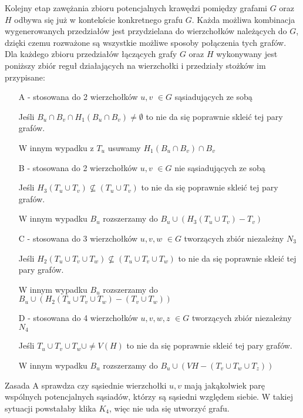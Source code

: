 Kolejny etap zawężania zbioru potencjalnych krawędzi pomiędzy grafami $G$ oraz $H$ odbywa się już w kontekście konkretnego grafu $G$. Każda możliwa kombinacja wygenerowanych przedziałów jest  przydzielana do wierzchołków należących do $G$, dzięki czemu rozważone są wszystkie możliwe sposoby połączenia tych grafów. Dla każdego zbioru przedziałów łączących grafy $G$ oraz $H$ wykonywany jest poniższy zbiór reguł działających na wierzchołki i przedziały stożków im przypisane:
\begin{itemize}
  \item[A] - stosowana do 2 wierzchołków $u,v$ $\in G$ sąsiadujących ze sobą 
  
  Jeśli $B_u \cap B_v \cap H_1(B_u \cap B_v) \neq \emptyset $ to nie da się 
  poprawnie skleić tej pary grafów. 
  
  W innym wypadku z $T_u$ usuwamy $H_1(B_u \cap B_v) \cap B_v $  
  \item[B] - stosowana do 2 wierzchołków $u,v$ $\in G$ nie sąsiadujących ze sobą 
  
  Jeśli $H_3(T_u \cup T_v) \not\subseteq (T_u \cup T_v)$ to nie da się poprawnie skleić tej 
  pary grafów. 
  
  W innym wypadku $B_u$ rozszerzamy do $B_u \cup (H_3(T_u \cup T_v) - T_v)$
  \item[C] - stosowana do 3 wierzchołków $u,v,w$ $\in G$ tworzących zbiór niezależny $N_3$ 
  
  Jeśli $H_2(T_u \cup T_v \cup T_w) \not\subseteq (T_u \cup T_v \cup T_w)$ 
  to nie da się poprawnie skleić tej pary grafów. 
  
  W innym wypadku $B_u$ rozszerzamy do $B_u \cup (H_2(T_u \cup T_v \cup T_w) - (T_v \cup T_w))$
  \item[D] - stosowana do 4 wierzchołków $u,v,w,z$ $\in G$ tworzących zbiór niezależny $N_4$  
  
  Jeśli $T_u \cup T_v \cup T_w \cup \neq V(H) $ to nie da się poprawnie skleić tej pary grafów.
  
  W innym wypadku $B_u$ rozszerzamy do $B_u \cup (VH - (T_v \cup T_w \cup T_z))$
\end{itemize}

Zasada A sprawdza czy sąsiednie wierzchołki $u, v$ mają jakąkolwiek parę wspólnych potencjalnych sąsiadów, którzy są sąsiedni względem siebie.
W takiej sytuacji powstałaby klika $K_4$, więc nie uda się utworzyć grafu. \par


